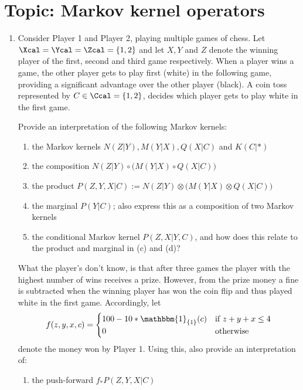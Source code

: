 

\section*{Topic: Markov kernel operators}

\begin{enumerate}
  \item
  Consider Player 1 and Player 2, playing multiple games of chess. Let $\Xcal = \Ycal = \Zcal = \{1,2\}$ and let $X, Y$ and $Z$ denote the winning player of the first, second and third game respectively. When a player wins a game, the other player gets to play first (white) in the following game, providing a significant advantage over the other player (black). A coin toss represented by $C \in \Ccal = \{1,2\}$, decides which player gets to play white in the first game.

  Provide an interpretation of the following Markov kernels: %
  \begin{enumerate}
    \item the Markov kernels $N(Z|Y), M(Y|X), Q(X|C)$ and $K(C|*)$
    \item the composition $N(Z|Y) \circ \big(M(Y|X)\circ Q(X|C)\big)$
    \item the product $P(Z, Y, X|C) := N(Z|Y) \otimes \big(M(Y|X)\otimes Q(X|C)\big)$
    \item the marginal $P(Y|C)$; also express this as a composition of two Markov kernels
    \item the conditional Markov kernel $P(Z,X|Y,C)$, and how does this relate to the product and marginal in (c) and (d)?
  \end{enumerate}
  What the player's don't know, is that after three games the player with the highest number of wins receives a prize. However, from the prize money a fine is subtracted when the winning player has won the coin flip and thus played white in the first game. Accordingly, let
  $$f(z,y,x, c) = \begin{cases} 100 - 10*\mathbbm{1}_{\{1\}}(c) & \text{if $z+y+x \leq 4$} \\ 0 &\text{otherwise}\end{cases}$$
  denote the money won by Player 1. Using this, also provide an interpretation of:
  \begin{enumerate}
    \item[(f)] the push-forward $f_*P(Z, Y, X|C)$
  \end{enumerate}


\end{enumerate}
